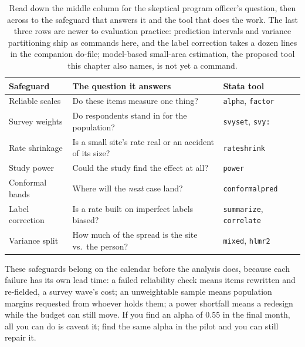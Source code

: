 \begin{table}[htbp]
\centering
\caption[The chapter's safeguards and the question each answers]{Read down the middle column for the skeptical program officer's question, then across to the safeguard that answers it and the tool that does the work. The last three rows are newer to evaluation practice: prediction intervals and variance partitioning ship as commands here, and the label correction takes a dozen lines in the companion do-file; model-based small-area estimation, the proposed tool this chapter also names, is not yet a command.}
\label{tab:ch07-viz-map}
{\footnotesize
\begin{tabular}{p{2.3cm}p{4.7cm}p{2.4cm}}
\hline
Safeguard & The question it answers & Stata tool \\
\hline
Reliable scales & Do these items measure one thing? & \texttt{alpha}, \texttt{factor} \\
Survey weights & Do respondents stand in for the population? & \texttt{svyset}, \texttt{svy:} \\
Rate shrinkage & Is a small site's rate real or an accident of its size? & \texttt{rateshrink} \\
Study power & Could the study find the effect at all? & \texttt{power} \\
Conformal bands & Where will the \emph{next} case land? & \texttt{conformalpred} \\
Label correction & Is a rate built on imperfect labels biased? & \texttt{summarize}, \texttt{correlate} \\
Variance split & How much of the spread is the site vs.\ the person? & \texttt{mixed}, \texttt{hlmr2} \\
\hline
\end{tabular}
}
\end{table}

These safeguards belong on the calendar before the analysis does, because each failure has its own lead time: a failed reliability check means items rewritten and re-fielded, a survey wave's cost; an unweightable sample means population margins requested from whoever holds them; a power shortfall means a redesign while the budget can still move. If you find an alpha of 0.55 in the final month, all you can do is caveat it; find the same alpha in the pilot and you can still repair it.

